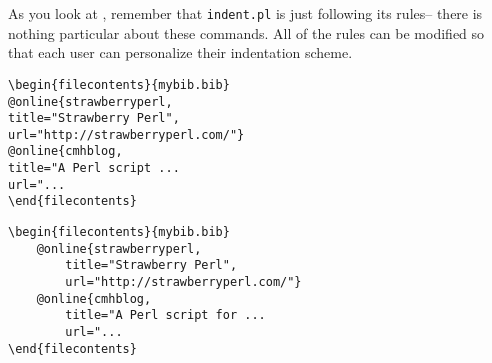  As you look at , remember
 that \lstinline!indent.pl! is just following its rules-- there is nothing 
 particular about these commands. All of the rules can be modified 
 so that each user can personalize their indentation scheme.
 \begin{adjustwidth}{-2cm}{2cm}
 	\begin{minipage}{.5\textwidth}
 		\begin{lstlisting}[style=demo,caption={\lstinline!filecontents! before},label={lst:filecontentsbefore}]
\begin{filecontents}{mybib.bib}
@online{strawberryperl,
title="Strawberry Perl",
url="http://strawberryperl.com/"}
@online{cmhblog,
title="A Perl script ...
url="...
\end{filecontents}
 		\end{lstlisting}
 	\end{minipage}%
 	\begin{minipage}{.5\textwidth}
 		\begin{lstlisting}[style=demo,caption={\lstinline!filecontents! after}]
\begin{filecontents}{mybib.bib}
	@online{strawberryperl,
		title="Strawberry Perl",
		url="http://strawberryperl.com/"}
	@online{cmhblog,
		title="A Perl script for ...
		url="...
\end{filecontents}
 		\end{lstlisting}
 	\end{minipage}
 	 	 	 	 				

\end{adjustwidth}

